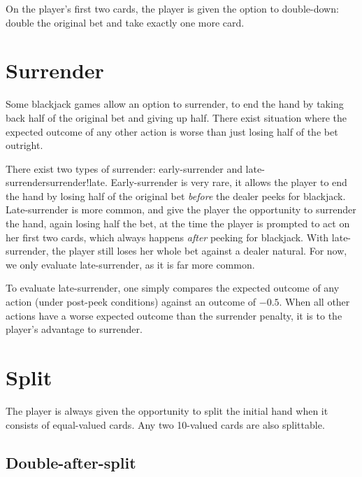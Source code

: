 On the player's first two cards, the player is given the option to
double-down: double the original bet and take exactly one more card.

\section{Surrender}
\label{sec:basic:surrender}

Some blackjack games allow an option to surrender, 
to end the hand by taking back half of the original
bet and giving up half.
There exist situation where the expected outcome of any other action 
is worse than just losing half of the bet outright.  

There exist two types of surrender:
early-surrender and late-surrender{surrender!late}.
Early-surrender is very rare, it allows the player to 
end the hand by losing half of the original bet \emph{before}
the dealer peeks for blackjack.
Late-surrender is more common, and give the player the opportunity to
surrender the hand, again losing half the bet, 
at the time the player is prompted to act on her first two cards, 
which always happens \emph{after} peeking for blackjack.  
With late-surrender, the player still loses her whole bet against 
a dealer natural.
For now, we only evaluate late-surrender, as it is far more common.

To evaluate late-surrender, one simply compares the expected outcome
of any action (under post-peek conditions) against an outcome of $-0.5$.
When all other actions have a worse expected outcome than the surrender
penalty, it is to the player's advantage to surrender.

\section{Split}
\label{sec:basic:split}

The player is always given the opportunity to split
the initial hand when it consists of equal-valued cards.
Any two 10-valued cards are also splittable.

\subsection{Double-after-split}
\label{sec:basic:DAS}

